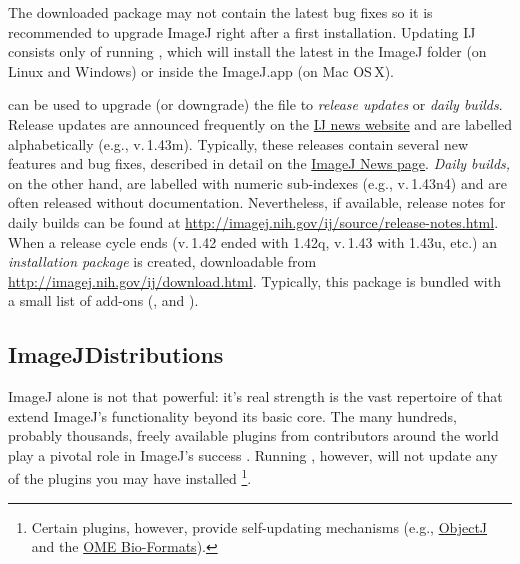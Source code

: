 The downloaded package may not contain the latest bug fixes so it
is recommended to upgrade ImageJ right after a first installation.
Updating IJ consists only
of running \textsf{},
which will install the latest 
in the ImageJ folder (on Linux and Windows) or inside the ImageJ.app
(on Mac OS\,X). 

\textsf{}
can be used to upgrade (or downgrade) the  file
to \emph{release updates} or \emph{daily builds}. Release updates
are announced frequently on the \href{http://imagej.nih.gov/ij/notes.html}{IJ news website}
and are labelled alphabetically (e.g., v.\,1.43m). Typically, these
releases contain several new features and bug fixes, described in
detail on the \href{http://imagej.nih.gov/ij/notes.html}{ImageJ News page}.
\emph{Daily builds,} on the other hand, are labelled with numeric
sub-indexes (e.g., v.\,1.43n4) and are often released without documentation.
Nevertheless, if available, release notes for daily builds can be
found at \url{http://imagej.nih.gov/ij/source/release-notes.html}.
When a release cycle ends (v.\,1.42 ended with 1.42q, v.\,1.43 with
1.43u, etc.) an \emph{installation package }is created, downloadable
from \url{http://imagej.nih.gov/ij/download.html}. Typically, this
package is bundled with a small list of add-ons (,
 and ).




\subsection{ImageJDistributions\label{sec:ImageJ-Distributions}}

ImageJ alone is not that powerful: it's real strength is the vast
repertoire of  that extend ImageJ's functionality
beyond its basic core. The many hundreds, probably thousands,  freely
available plugins from contributors around the world play a pivotal
role in ImageJ's success \cite{Collins:2007p13684}. Running \textsf{},
however, will not update any of the plugins you may have installed%
\footnote{Certain plugins, however, provide self-updating mechanisms (e.g.,
\href{http://simon.bio.uva.nl/objectj/}{ObjectJ} and the \href{http://loci.wisc.edu/software/bio-formats}{OME Bio-Formats}).%
}.

